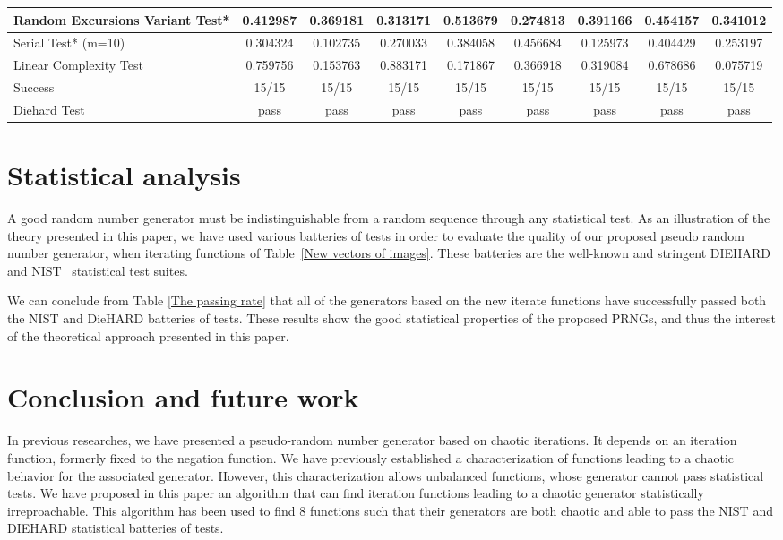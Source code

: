\documentclass[conference]{IEEEtran}
\begin{document}
\begin{table*}[t]
\begin{tabular}{|l||c|c|c|c|c|c|c|c|}
Random Excursions Variant Test*            &  0.412987 &  0.369181 &  0.313171 &  0.513679 &  0.274813 &  0.391166 &  0.454157 &    0.341012 \\ \hline
Serial Test* (m=10)                &  0.304324 &  0.102735 &  0.270033 &  0.384058 &  0.456684 &  0.125973 &  0.404429 &    0.253197 \\ \hline
Linear Complexity Test                &0.759756 &  0.153763 &  0.883171 &  0.171867 &  0.366918 &  0.319084 &  0.678686 &    0.075719 \\ \hline
Success                     &15/15&15/15&15/15&15/15&15/15&15/15&15/15&15/15  \\ \hline\hline
Diehard Test               &pass&pass&pass&pass&pass&pass&pass&pass\\ \hline
  \end{tabular}
\end{table*}






\section{Statistical analysis}
\label{sec:nist}
A good random number generator must be indistinguishable from a random sequence through any statistical test. 
As an illustration of the theory presented in this paper, we have used various batteries of tests in order to evaluate the quality of our proposed pseudo random number generator, when iterating functions of Table~\ref{New vectors of images}. These batteries are the well-known and stringent  DIEHARD~\cite{diehard} and NIST~\cite{nist} statistical test suites.

We can conclude from Table \ref{The passing rate} that all of the generators based on the new iterate functions have successfully passed both the NIST and DieHARD batteries of tests. 
These results show the good statistical properties of the proposed PRNGs, and thus the interest of the theoretical approach presented in this paper.

\section{Conclusion and future work}
\label{Conclusions and Future Work}

In previous researches, we have presented a pseudo-random number generator based on chaotic iterations.
It depends on an iteration function, formerly fixed to the negation function.
We have previously established a characterization of functions leading to a chaotic behavior for the associated generator.
However, this characterization allows unbalanced functions, whose generator cannot pass statistical tests.
We have proposed in this paper an algorithm that can find iteration functions leading to a chaotic generator statistically irreproachable. 
This algorithm has been used to find 8 functions such that their generators are both chaotic and able to pass the NIST and DIEHARD statistical batteries of tests.
\end{document}
